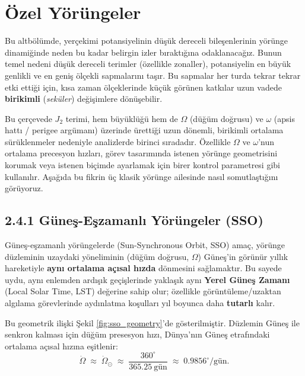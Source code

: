 \section{Özel Yörüngeler}
\label{sec:special_orbits}

Bu altbölümde, yerçekimi potansiyelinin düşük dereceli bileşenlerinin yörünge dinamiğinde neden bu kadar belirgin izler bıraktığına odaklanacağız. Bunun temel nedeni düşük dereceli terimler (özellikle zonaller), potansiyelin en büyük genlikli ve en geniş ölçekli sapmalarını taşır. Bu sapmalar her turda tekrar tekrar etki ettiği için, kısa zaman ölçeklerinde küçük görünen katkılar uzun vadede \textbf{birikimli} (\emph{seküler}) değişimlere dönüşebilir.

Bu çerçevede $J_2$ terimi, hem büyüklüğü hem de $\Omega$ (düğüm doğrusu) ve $\omega$ (apsis hattı / perigee argümanı) üzerinde ürettiği uzun dönemli, birikimli ortalama sürüklenmeler nedeniyle analizlerde birinci sıradadır. Özellikle $\Omega$ ve $\omega$’nun
ortalama precesyon hızları, görev tasarımında istenen yörünge geometrisini korumak veya istenen biçimde ayarlamak için birer kontrol parametresi gibi kullanılır. Aşağıda bu fikrin üç klasik yörünge ailesinde nasıl somutlaştığını görüyoruz.


\subsection*{2.4.1 \hspace{0.25em} Güneş-Eşzamanlı Yörüngeler (SSO)}
\label{subsec:sso}

Güneş-eşzamanlı yörüngelerde (Sun-Synchronous Orbit, SSO) amaç,
yörünge düzleminin uzaydaki yöneliminin (düğüm doğrusu, $\Omega$)
Güneş'in görünür yıllık hareketiyle \textbf{aynı ortalama açısal hızda}
dönmesini sağlamaktır.
Bu sayede uydu, aynı enlemden ardışık geçişlerinde yaklaşık aynı
\textbf{Yerel Güneş Zamanı} (Local Solar Time, LST) değerine sahip olur;
özellikle görüntüleme/uzaktan algılama görevlerinde aydınlatma koşulları
yıl boyunca daha \textbf{tutarlı} kalır.

Bu geometrik ilişki Şekil \ref{fig:sso_geometry}'de gösterilmiştir.
Düzlemin Güneş ile senkron kalması için düğüm presesyon hızı,
Dünya'nın Güneş etrafındaki ortalama açısal hızına eşitlenir:
\begin{equation}
\dot\Omega \;\approx\; \dot\Omega_{\odot}
\;\approx\; \frac{360^{\circ}}{365.25\ \text{gün}}
\;\approx\; 0.9856^{\circ}/\text{gün}.
\label{eq:sso_condition}
\end{equation}

